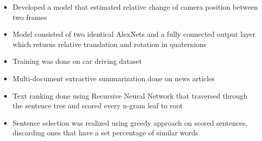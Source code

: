 \documentclass[10pt,a4paper]{source/altacv}
\begin{document}




\begin{itemize}
    \item \small{Developed a model that estimated relative change of camera position between two frames}
    \item \small{Model consisted of two identical AlexNets and a fully connected output layer which returns relative translation and rotation in quaternions}
    \item \small{Training was done on car driving dataset}
    \\
    \smallskip
      
\end{itemize}
    
\divider



\begin{itemize}
  \item \small{Multi-document extractive summarization done on news articles}
  \item \small{Text ranking done using Recursive Neural Network that traversed through the sentence tree and scored every n-gram leaf to root}
  \item \small{Sentence selection was realized using greedy approach on scored sentences, discarding ones that have a set percentage of similar words}
  \\
  \smallskip
    
\end{itemize}

\divider
\end{document}

